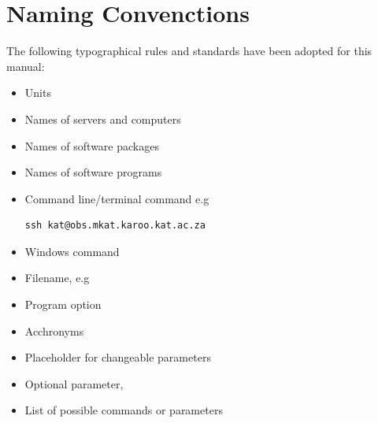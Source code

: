 \documentclass[12pt]{report}
\begin{document}
 \chapter*{Naming Convenctions }
 The following typographical rules and standards \cite{standard1} \cite{standard2} have been adopted for this manual:
 \begin{itemize}
 	\item {} Units
 	\item {} Names of servers and computers
 	\item {} Names of software packages
 	\item {} Names of software programs
 	\item {} Command line/terminal command e.g 
 	\begin{lstlisting}[style=DOS]
 	ssh kat@obs.mkat.karoo.kat.ac.za
 	\end{lstlisting}
 	\item {} Windows command
 	\item {} Filename, e.g
 	\item {} Program option
 	\item {} Acchronyms
 	\item {} Placeholder for changeable parameters
 	\item {} Optional parameter,
 	\item{ } List of possible commands or parameters
 	
 \end{itemize}
\end{document}
